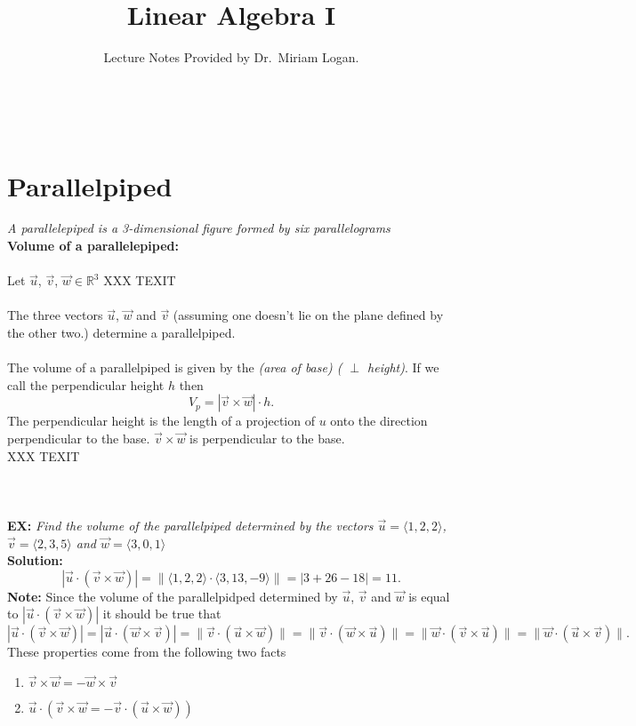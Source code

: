 \documentclass{report}
\begin{document}
\title{Linear Algebra I}
\author{Lecture Notes Provided by Dr.~Miriam Logan.}
\date{}
\maketitle
\tableofcontents
\newpage
\\
\section{Parallelpiped}
\textit{A parallelepiped is a 3-dimensional figure formed by six parallelograms} \\
\textbf{Volume of a parallelepiped:} \\
\\
Let $\vec{u} $, $\vec{v} $, $\vec{w} \in \mathbb{R}^3$
XXX TEXIT
\\
\\
The three vectors  $\vec{u} $, $\vec{w} $ and $\vec{v} $ (assuming one doesn't lie on the plane defined by the other two.) determine a parallelpiped. \\
\\
The volume of a parallelpiped is given by the \textit{(area of base) ( $\perp$ height)}. If we call the perpendicular height $h$ then
\[
V_p = | \vec{v} \times \vec{w} | \cdot h
.\] 
The perpendicular height is the length of a projection of $u$ onto the direction perpendicular to the base. $\vec{v} \times \vec{w} $ is perpendicular to the base.\\
XXX TEXIT\\
\\
\\
\\
\textbf{EX:} \textit{Find the volume of the parallelpiped determined by the vectors $\vec{u} = \langle 1,2,2  \rangle $, $\vec{v} = \langle 2,3,5  \rangle $ and $\vec{w} = \langle 3,0,1  \rangle $}\\
\textbf{Solution:} \[
|\vec{u} \cdot \left( \vec{v} \times \vec{w}  \right) | = \|\langle 1,2,2  \rangle \cdot \langle 3,13,-9  \rangle \| = | 3 + 26 -18| =11
.\] 
\textbf{Note:}  Since the volume of the parallelpidped determined by $\vec{u} $, $\vec{v} $ and $ \vec{ w} $ is equal to $|\vec{u} \cdot \left( \vec{v} \times \vec{w}  \right) |$ it should be true that 
\[
|\vec{u} \cdot \left( \vec{v} \times \vec{w}  \right) | = |\vec{u} \cdot \left( \vec{w} \times \vec{v}  \right) | = \|\vec{v} \cdot \left( \vec{u} \times  \vec{w}  \right) \|= \|\vec{v} \cdot \left( \vec{w} \times \vec{u}  \right) \|= \|\vec{w} \cdot \left( \vec{v} \times \vec{u}  \right) \|= \|\vec{w} \cdot \left( \vec{u} \times \vec{v}  \right) \|
.\] 
These properties come from the following two facts
\begin{enumerate}[label=(\roman*)]
  \item $\vec{v} \times \vec{w} = - \vec{w} \times  \vec{v} $
  \item $\vec{u} \cdot  \left( \vec{v} \times  \vec{w} = -\vec{v} \cdot \left( \vec{u} \times \vec{w}  \right)  \right) $
\end{enumerate}
\end{document}

